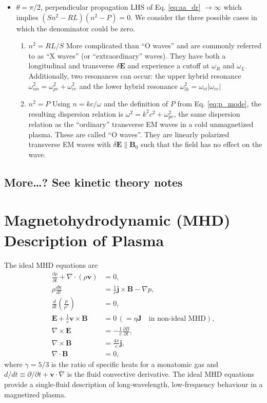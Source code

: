 \begin{itemize}
		\item{$\theta=\pi/2$, perpendicular propagation}
		LHS of Eq. \ref{eq:aa_dr} $\to\infty$ which implies  $(Sn^2 - RL)(n^2 - P)=0$. We consider the three possible cases in which the denominator could be zero.

		\begin{enumerate}

			\item{$n^2=RL/S$}
			More complicated than ``O waves'' and are commonly referred to as ``X waves'' (or ``extraordinary'' waves). They have both a longitudinal and transverse $\delta\mathbf{E}$ and experience a cutoff at $\omega_R$ and $\omega_L$. Additionally, two resonances can occur: the upper hybrid resonance $\omega_{un}^2=\omega_{pe}^2 + \omega_{ce}^2$ and the lower hybrid resonance $\omega_{lh}^2 = \omega_{ci}|\omega_{ce}|$

			\item{$n^2=P$}
			Using $n=kc/\omega$ and the definition of $P$ from Eq. \ref{eq:p_mode}, the resulting dispersion relation is $\omega^2=k^2c^2 + \omega_{pe}^2$, the same dispersion relation as the ``ordinary'' transverse EM waves in a cold unmagnetized plasma. These are called ``O waves''. They are linearly polarized transverse EM waves with $\delta\mathbf{E}\parallel\mathbf{B}_0$ such that the field has no effect on the wave. 
		\end{enumerate}
	\end{itemize}

	\subsection{More\ldots? See kinetic theory notes}

\section{Magnetohydrodynamic (MHD) Description of Plasma}

The ideal MHD equations are
\begin{align}
	\frac{\partial\rho}{\partial t} + \nabla\cdot(\rho\mathbf{v}) &= 0,\label{eq:mhd_mass}\\
	\rho\frac{d\mathbf{v}}{dt} &= \frac{1}{c}\mathbf{j}\times\mathbf{B} - \nabla p,\label{eq:mhd_mmtm}\\
	\frac{d}{dt}\left(\frac{p}{\rho^{\gamma}}\right)&=0,\label{eq:mhd_energy}\\
	\mathbf{E} + \frac{1}{c}\mathbf{v}\times\mathbf{B} &= 0\,(=\eta\mathbf{J}\quad\text{in non-ideal MHD}),\label{eq:mhd_ohm}\\
	\nabla\times\mathbf{E} &= -\frac{1}{c}\frac{\partial B}{\partial t},\\
	\nabla\times\mathbf{B} &= \frac{4\pi}{c}\mathbf{j},\label{eq:low_freq_ampere}\\
	\nabla\cdot\mathbf{B} &= 0,
\end{align}
where $\gamma=5/3$ is the ratio of specific heats for a monatomic gas and $d/dt\equiv \partial/\partial t + \mathbf{v}\cdot\nabla$ is the fluid convective derivative. The ideal MHD equations provide a single-fluid description of long-wavelength, low-frequency behaviour in a magnetized plasma.

